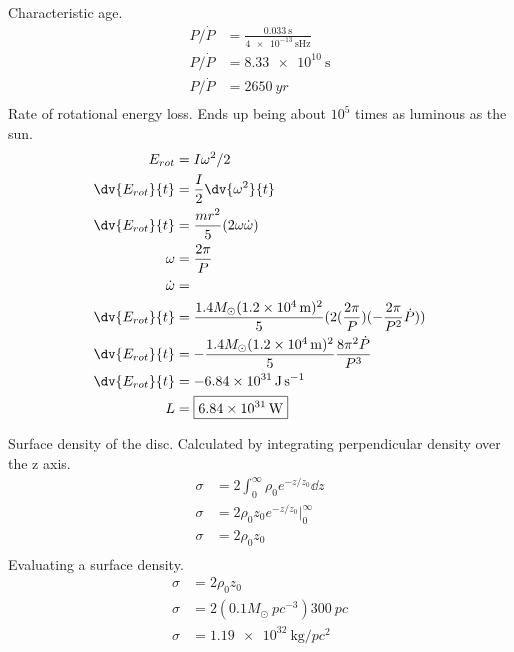\documentclass{homework}
\begin{document}
\newpage
\question
Characteristic age.
\begin{align*}
    P/\dot{P}	&=	\frac{\SI{0.033}{\second}}{\SI{4e-13}{\second\hertz}}	\\
    P/\dot{P}    &=	\SI{8.33e10}{\second}	\\
    P/\dot{P}    &=	\boxed{\SI{2650}{yr}}	\\    
\end{align*}
Rate of rotational energy loss. Ends up being about $10^5$ times as luminous as the sun.
\begin{align*}
    E_{rot}	&=	I\omega^2/2	\\
    \dv{E_{rot}}{t} &=  \frac{I}{2} \dv{\omega^2}{t}   \\
    \dv{E_{rot}}{t} &=  \frac{mr^2}{5} (2 \omega \dot{\omega})   \\
    \omega    &=	\frac{2\pi}{P}	\\
    \dot{\omega}    &=     \\
    \dv{E_{rot}}{t} &=  \frac{1.4 M_\odot (\SI{1.2e4}{\metre})^2}{5} (2( \frac{2\pi}{P}) (-\frac{2\pi}{P^2} \dot{P}))   \\
    \dv{E_{rot}}{t} &=  -\frac{1.4 M_\odot (\SI{1.2e4}{\metre})^2}{5} \frac{8\pi^2 \dot{P}}{P^3}   \\
    \dv{E_{rot}}{t} &=  -\SI{6.84e31}{\joule\per\second}   \\
    L   &=  \boxed{\SI{6.84e31}{\watt}}
\end{align*}


\question
Surface density of the disc. Calculated by integrating perpendicular density over the z axis.
\begin{align*}
    \sigma	&=  2 \int_{0}^{\infty} \rho_0 e^{-z/z_0} \dd{z}	\\
    \sigma	&=  2 \rho_0 z_0 e^{-z/z_0}|_0^{\infty}	\\
    \sigma	&=  \boxed{2 \rho_0 z_0}	\\
\end{align*}
Evaluating a surface density.
\begin{align*}
    \sigma	&=	2 \rho_0 z_0	\\
    \sigma	&=	2 (0.1 M_\odot \SI{}{pc^{-3}}) \SI{300}{pc}	\\
    \sigma    &=	\boxed{\SI{1.19e32}{\kilogram\per pc^2}}	\\
\end{align*}
\end{document}
